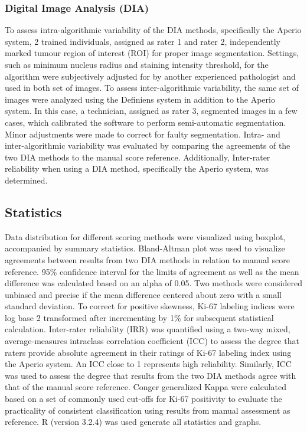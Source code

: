 \documentclass[final,1p,times]{elsarticle}
\begin{document}
\subsubsection*{Digital Image Analysis (DIA)}
To assess intra-algorithmic variability of the DIA methods, specifically the Aperio system, 2 trained individuals, assigned as rater 1 and rater 2, independently marked tumour region of interest (ROI) for proper image segmentation. Settings, such as minimum nucleus radius and staining intensity threshold, for the algorithm were subjectively adjusted for by another experienced pathologist and used in both set of images. To assess inter-algorithmic variability, the same set of images were analyzed using the Definiens system in addition to the Aperio system. In this case, a technician, assigned as rater 3, segmented images in a few cases, which calibrated the software to perform semi-automatic segmentation. Minor adjustments were made to correct for faulty segmentation. Intra- and inter-algorithmic variability was evaluated by comparing the agreements of the two DIA methods to the manual score reference. Additionally, Inter-rater reliability when using a DIA method, specifically the Aperio system, was determined.

\subsection*{Statistics}
Data distribution for different scoring methods were visualized using boxplot, accompanied by summary statistics. Bland-Altman plot was used to visualize agreements between results from two DIA methods in relation to manual score reference. \cite{Bland1986} 95\% confidence interval for the limits of agreement as well as the mean difference was calculated based on an alpha of 0.05. Two methods were considered unbiased and precise if the mean difference centered about zero with a small standard deviation. \cite{Hanneman2008} To correct for positive skewness, Ki-67 labeling indices were log base 2 transformed after incrementing by 1\% for subsequent statistical calculation. Inter-rater reliability (IRR) was quantified using a two-way mixed, average-measures intraclass correlation coefficient (ICC) to assess the degree that raters provide absolute agreement in their ratings of Ki-67 labeling index using the Aperio system. \cite{Shrout1979} An ICC close to 1 represents high reliability. Similarly, ICC was used to assess the degree that results from the two DIA methods agree with that of the manual score reference. Conger generalized Kappa were calculated based on a set of commonly used cut-offs for Ki-67 positivity to evaluate the practicality of consistent classification using results from manual assessment as reference. \cite{Conger1980} R (version 3.2.4) was used generate all statistics and graphs.
\end{document}
